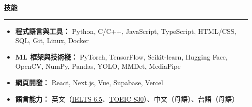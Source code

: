 \documentclass[10pt,a4paper]{article}
\newcommand{\sectiontitle}[1]{%
  \vspace{5pt}
  {\large\textbf{#1}}\par
  \vspace{-1pt}
  \hrule
  \vspace{2pt}
}
\begin{document}
\sectiontitle{技能}
\footnotesize
\begin{itemize}
  \item \textbf{程式語言與工具：} Python, C/C++, JavaScript, TypeScript, HTML/CSS, SQL, Git, Linux, Docker
  \item \textbf{ML 框架與技術棧：} PyTorch, TensorFlow, Scikit-learn, Hugging Face, OpenCV, NumPy, Pandas, YOLO, MMDet, MediaPipe
  \item \textbf{網頁開發：} React, Next.js, Vue, Supabase, Vercel
  \item \textbf{語言能力：} 英文（\href{https://github.com/balaboom123/balaboom123/blob/main/certifications/language/IELTS-2024-02-17.jpg}{\uline{IELTS 6.5}}、\href{https://github.com/balaboom123/balaboom123/blob/main/certifications/language/TOEIC-2023-07-27.jpg}{\uline{TOEIC 830}}）、中文（母語）、台語（母語）
\end{itemize}
\end{document}
